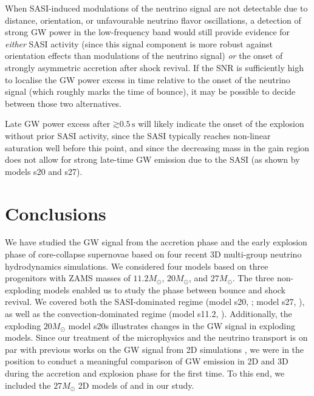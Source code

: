 When SASI-induced modulations of the neutrino signal are not detectable due to
distance, orientation, or unfavourable neutrino flavor oscillations, a detection of strong GW power in the
low-frequency band would still provide evidence for \emph{either}
SASI activity (since this signal component is more robust against
orientation effects than modulations of the neutrino signal)
\emph{or} the onset of strongly asymmetric accretion after shock
revival. If the SNR is sufficiently high to localise the GW power excess in time relative to the onset of the neutrino signal (which roughly marks
the time of bounce), it may be possible to decide between those two alternatives.

Late GW power excess after $\mathord{\gtrsim} 0.5 \, \mathrm{s}$ will
likely indicate the onset of the explosion without prior SASI activity,
since the SASI typically reaches non-linear saturation well before this point,
and since the decreasing mass in the gain region does not allow for strong
late-time GW emission due to the SASI (as shown by models s20 and s27).

\section{Conclusions} \label{sec:con}
We have studied the GW signal from the accretion phase and the early
explosion phase of core-collapse supernovae based on four recent 3D
multi-group neutrino hydrodynamics simulations. We considered four models based on three
progenitors with ZAMS masses of $11.2 M_\odot$, $20 M_\odot$, and $27 M_\odot$.
The three non-exploding models enabled us to study the phase between
bounce and shock revival. We covered both the SASI-dominated regime
(model s20, \citealp{tamborra_14b}; model s27, \citealp{hanke_13}), 
as well as the   
convection-dominated regime (model s11.2, \citealp{tamborra_14a}).
Additionally, the exploding $20 M_\odot$ model s20s
\citep[][with a modified axial-vector coupling constant for neutral
  current scattering]{melson_15b} illustrates changes in the GW signal
in exploding models.  Since our treatment of the microphysics and the
neutrino transport is on par with previous works on the GW signal from
2D simulations \citep{marek_08,yakunin_10,mueller_13,yakunin_15}, we
were in the position to conduct a meaningful comparison of GW emission
in 2D and 3D during the accretion and explosion phase for the first
time. To this end, we included the $27 M_\odot$ 2D models of
\citet{mueller_12b} and  \citet{hanke_13} in our study.

